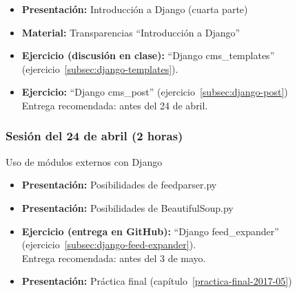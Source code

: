 \documentclass[a4paper,12pt]{article}
\begin{document}
\begin{itemize}
    \item \textbf{Presentación:} Introducción a Django (cuarta parte)
    \item \textbf{Material:} Transparencias ``Introducción a Django''
    \item \textbf{Ejercicio (discusión en clase):} ``Django cms\_templates'' (ejercicio~\ref{subsec:django-templates}). \\
    \item \textbf{Ejercicio:} ``Django cms\_post'' (ejercicio~\ref{subsec:django-post}) \\
  Entrega recomendada: antes del 24 de abril.
\end{itemize}

\subsubsection{Sesión del 24 de abril (2 horas)}

Uso de módulos externos con Django

\begin{itemize}
  \item \textbf{Presentación:} Posibilidades de feedparser.py
  \item \textbf{Presentación:} Posibilidades de BeautifulSoup.py
  \item \textbf{Ejercicio (entrega en GitHub):} ``Django feed\_expander'' (ejercicio~\ref{subsec:django-feed-expander}). \\
  Entrega recomendada: antes del 3 de mayo.
\item \textbf{Presentación:} Práctica final (capítulo~\ref{practica-final-2017-05})
\end{itemize}


\end{document}
